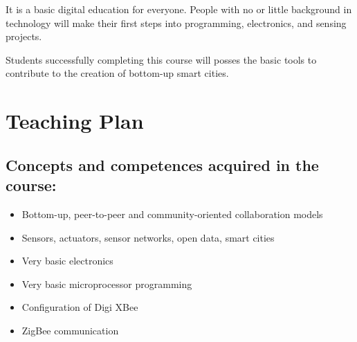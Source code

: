 \documentclass{tufte-book} %
\begin{document}
It is a basic digital education for everyone. People with no or little background in technology will make their first steps into programming, electronics, and sensing projects.

Students successfully completing this course will posses the basic tools to contribute to the creation of bottom-up smart cities.

% 
% 
% 




\chapter{Teaching Plan}

\section{Concepts and competences acquired in the course:}
\begin{itemize}
\item Bottom-up, peer-to-peer and community-oriented collaboration models
\item Sensors, actuators, sensor networks, open data, smart cities
\item Very basic electronics
\item Very basic microprocessor programming
\item Configuration of Digi XBee
\item ZigBee communication
\end{itemize}
\end{document}
